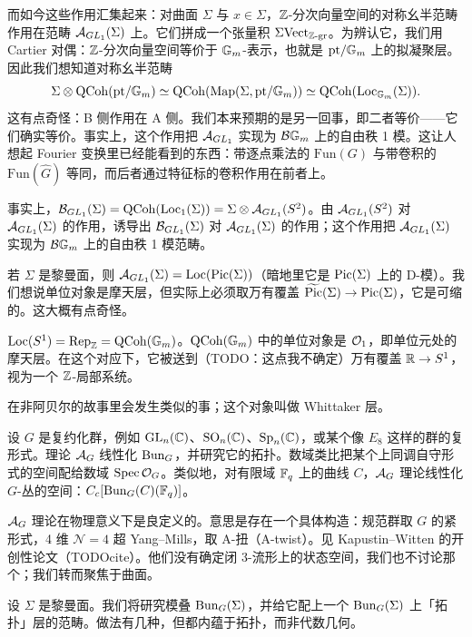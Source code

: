 而如今这些作用汇集起来：对曲面 $\Sigma$ 与 $x\in\Sigma$，$\mathbb{Z}$-分次向量空间的对称幺半范畴作用在范畴 $\mathcal{A}_{GL_1}(\Sigma)$ 上。它们拼成一个张量积 $\Sigma\mathrm{Vect}_{\mathbb{Z}\text{-}\mathrm{gr}}$。为辨认它，我们用 Cartier 对偶：$\mathbb{Z}$-分次向量空间等价于 $\mathbb{G}_m$-表示，也就是 $\mathrm{pt}/\mathbb{G}_m$ 上的拟凝聚层。因此我们想知道对称幺半范畴
\[
  \Sigma\otimes\mathrm{QCoh}(\mathrm{pt}/\mathbb{G}_m) \simeq \mathrm{QCoh}(\mathrm{Map}(\Sigma,\mathrm{pt}/\mathbb{G}_m))
  \simeq \mathrm{QCoh}(\mathrm{Loc}_{\mathbb{G}_m}(\Sigma)).
\]
这有点奇怪：B 侧作用在 A 侧。我们本来预期的是另一回事，即二者等价——它们确实等价。事实上，这个作用把 $\mathcal{A}_{GL_1}$ 实现为 $\mathcal{B}\mathbb{G}_m$ 上的自由秩 1 模。这让人想起 Fourier 变换里已经能看到的东西：带逐点乘法的 $\mathrm{Fun}(G)$ 与带卷积的 $\mathrm{Fun}(\widehat G)$ 等同，而后者通过特征标的卷积作用在前者上。

事实上，$\mathcal{B}_{GL_1}(\Sigma)=\mathrm{QCoh}(\mathrm{Loc}_1(\Sigma))=\Sigma\otimes\mathcal{A}_{GL_1}(S^2)$。由 $\mathcal{A}_{GL_1}(S^2)$ 对 $\mathcal{A}_{GL_1}(\Sigma)$ 的作用，诱导出 $\mathcal{B}_{GL_1}(\Sigma)$ 对 $\mathcal{A}_{GL_1}(\Sigma)$ 的作用；这个作用把 $\mathcal{A}_{GL_1}(\Sigma)$ 实现为 $\mathcal{B}\mathbb{G}_m$ 上的自由秩 1 模范畴。

若 $\Sigma$ 是黎曼面，则 $\mathcal{A}_{GL_1}(\Sigma)=\mathrm{Loc}(\operatorname{Pic}(\Sigma))$（暗地里它是 $\operatorname{Pic}(\Sigma)$ 上的 D-模）。我们想说单位对象是摩天层，但实际上必须取万有覆盖 $\widetilde{\operatorname{Pic}}(\Sigma)\to\operatorname{Pic}(\Sigma)$，它是可缩的。这大概有点奇怪。

\begin{example}
$\mathrm{Loc}(S^1)=\operatorname{Rep}_{\mathbb{Z}}=\mathrm{QCoh}(\mathbb{G}_m)$。$\mathrm{QCoh}(\mathbb{G}_m)$ 中的单位对象是 $\mathcal{O}_1$，即单位元处的摩天层。在这个对应下，它被送到（TODO：这点我不确定）万有覆盖 $\mathbb{R}\to S^1$，视为一个 $\mathbb{Z}$-局部系统。
\end{example}

在非阿贝尔的故事里会发生类似的事；这个对象叫做 Whittaker 层。


设 $G$ 是复约化群，例如 $\mathrm{GL}_n(\mathbb{C})$、$\mathrm{SO}_n(\mathbb{C})$、$\mathrm{Sp}_n(\mathbb{C})$，或某个像 $E_8$ 这样的群的复形式。理论 $\mathcal{A}_G$ 线性化 $\mathrm{Bun}_G$，并研究它的拓扑。数域类比把某个上同调自守形式的空间配给数域 $\operatorname{Spec}\mathcal{O}_G$。类似地，对有限域 $\mathbb{F}_q$ 上的曲线 $C$，$\mathcal{A}_G$ 理论线性化 $G$-丛的空间：$C_c[\mathrm{Bun}_G(C)(\mathbb{F}_q)]$。

$\mathcal{A}_G$ 理论在物理意义下是良定义的。意思是存在一个具体构造：规范群取 $G$ 的紧形式，4 维 $\mathcal{N}=4$ 超 Yang–Mills，取 A-扭（A-twist）。见 Kapustin–Witten 的开创性论文（TODOcite）。他们没有确定闭 3-流形上的状态空间，我们也不讨论那个；我们转而聚焦于曲面。

设 $\Sigma$ 是黎曼面。我们将研究模叠 $\mathrm{Bun}_G(\Sigma)$，并给它配上一个 $\mathrm{Bun}_G(\Sigma)$ 上「拓扑」层的范畴。做法有几种，但都内蕴于拓扑，而非代数几何。

